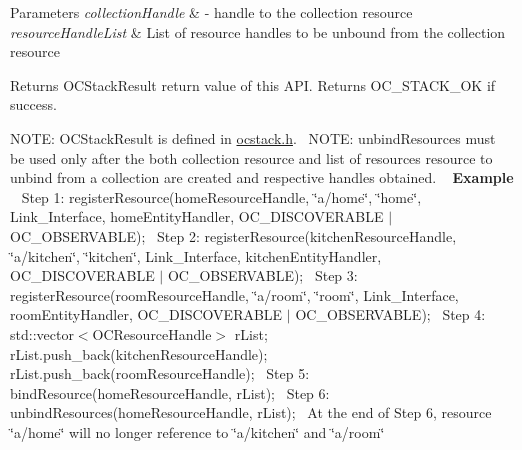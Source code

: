 \begin{DoxyParams}{Parameters}
{\em collection\+Handle} & -\/ handle to the collection resource \\
\hline
{\em resource\+Handle\+List} & List of resource handles to be unbound from the collection resource\\
\hline
\end{DoxyParams}
\begin{DoxyReturn}{Returns}
O\+C\+Stack\+Result return value of this A\+P\+I. Returns O\+C\+\_\+\+S\+T\+A\+C\+K\+\_\+\+O\+K if success. ~\newline

\end{DoxyReturn}
N\+O\+T\+E\+: O\+C\+Stack\+Result is defined in \hyperlink{ocstack_8h_source}{ocstack.\+h}.~\newline
 N\+O\+T\+E\+: unbind\+Resources must be used only after the both collection resource and list of resources resource to unbind from a collection are created and respective handles obtained. ~\newline
 {\bfseries Example} ~\newline
 Step 1\+: register\+Resource(home\+Resource\+Handle, \char`\"{}a/home\char`\"{}, \char`\"{}home\char`\"{}, Link\+\_\+\+Interface, home\+Entity\+Handler, O\+C\+\_\+\+D\+I\+S\+C\+O\+V\+E\+R\+A\+B\+L\+E $\vert$ O\+C\+\_\+\+O\+B\+S\+E\+R\+V\+A\+B\+L\+E);~\newline
 Step 2\+: register\+Resource(kitchen\+Resource\+Handle, \char`\"{}a/kitchen\char`\"{}, \char`\"{}kitchen\char`\"{}, Link\+\_\+\+Interface, kitchen\+Entity\+Handler, O\+C\+\_\+\+D\+I\+S\+C\+O\+V\+E\+R\+A\+B\+L\+E $\vert$ O\+C\+\_\+\+O\+B\+S\+E\+R\+V\+A\+B\+L\+E);~\newline
 Step 3\+: register\+Resource(room\+Resource\+Handle, \char`\"{}a/room\char`\"{}, \char`\"{}room\char`\"{}, Link\+\_\+\+Interface, room\+Entity\+Handler, O\+C\+\_\+\+D\+I\+S\+C\+O\+V\+E\+R\+A\+B\+L\+E $\vert$ O\+C\+\_\+\+O\+B\+S\+E\+R\+V\+A\+B\+L\+E);~\newline
 Step 4\+: std\+::vector$<$\+O\+C\+Resource\+Handle$>$ r\+List; r\+List.\+push\+\_\+back(kitchen\+Resource\+Handle); r\+List.\+push\+\_\+back(room\+Resource\+Handle);~\newline
 Step 5\+: bind\+Resource(home\+Resource\+Handle, r\+List);~\newline
 Step 6\+: unbind\+Resources(home\+Resource\+Handle, r\+List);~\newline
 At the end of Step 6, resource \char`\"{}a/home\char`\"{} will no longer reference to \char`\"{}a/kitchen\char`\"{} and \char`\"{}a/room\char`\"{}~\newline
 \hypertarget{classOC_1_1OCPlatform_ae42baa45cd2e70062b7582f8bbbdcc9a}{}
